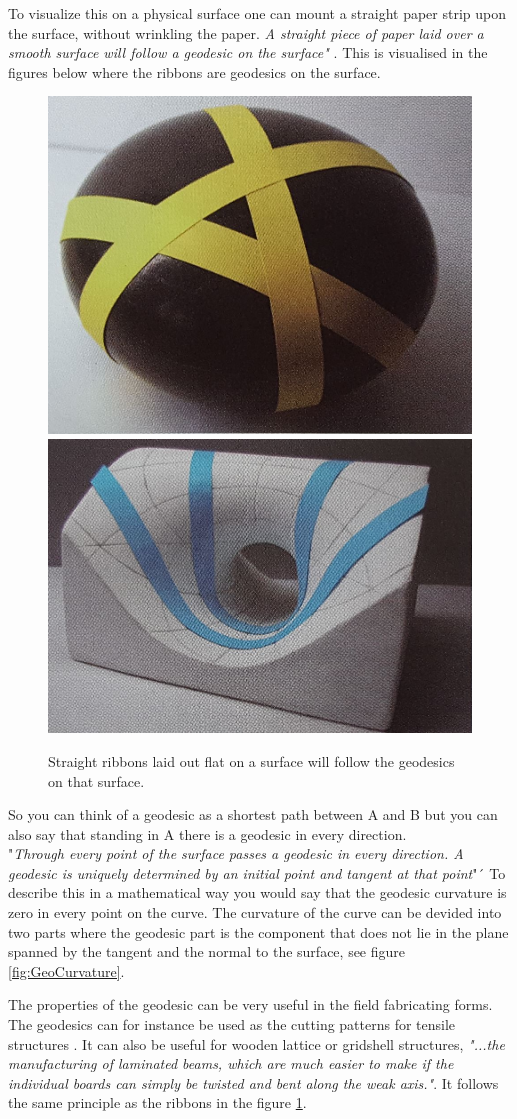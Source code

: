To visualize this on a physical surface one can  mount a straight paper strip upon the surface, without wrinkling the paper. \textit{A straight piece of paper laid over a smooth surface will follow a geodesic on the surface"} \cite{ref:ArchGeometry}. This is visualised in the figures below where the ribbons are geodesics on the surface.

\begin{figure}[H]
\centering
\includegraphics[height=0.35\linewidth ]{figure/Theory/geo1.JPG}
\includegraphics[height=0.35\linewidth ]{figure/Theory/geo2.JPG}
\caption{Straight ribbons laid out flat on a surface will follow the geodesics on that surface.\cite{ref:ArchGeometry} }
\label{fig:ribbon}
\end{figure}



So you can think of a geodesic as a shortest path between A and B but you can also say that standing in A there is a geodesic in every direction.\\
"\textit{Through every point of the surface passes a geodesic in every direction. A geodesic is uniquely determined by an initial point and tangent at that point}"´\cite{ref:Struik} 
To describe this in a mathematical way you would say that the geodesic curvature is zero in every point on the curve. The curvature of the curve can be devided into two parts where the geodesic part is the component that does not lie in the plane spanned by the tangent and the normal to the surface, see figure \ref{fig:GeoCurvature}. 

The properties of the geodesic can be very useful in the field fabricating forms. The geodesics can for instance be used as the cutting patterns for tensile structures \cite{ref:Williams2}. It can also be useful for wooden lattice or gridshell structures, \textit{"...the manufacturing of laminated beams, which are much easier to
make if the individual boards can simply be twisted and bent along the weak axis."}\cite{ref:Pottman}. It follows the same principle as the ribbons in the figure \ref{fig:ribbon}.


